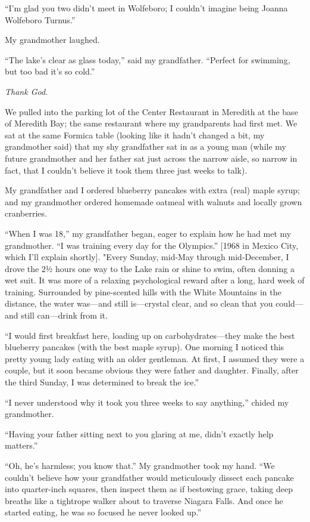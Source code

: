 ``I'm glad you two didn't meet in Wolfeboro; I couldn't imagine being
Joanna Wolfeboro Turnus.''

My grandmother laughed.

``The lake's clear as glass today,'' said my grandfather. ``Perfect for
swimming, but too bad it's so cold.''

\emph{Thank God.}

We pulled into the parking lot of the Center Restaurant in Meredith at
the base of Meredith Bay; the same restaurant where my grandparents had
first met. We sat at the same Formica table (looking like it hadn't
changed a bit, my grandmother said) that my shy grandfather sat in as a
young man (while my future grandmother and her father sat just across
the narrow aisle, so narrow in fact, that I couldn't believe it took
them three just weeks to talk).

My grandfather and I ordered blueberry pancakes with extra (real) maple
syrup; and my grandmother ordered homemade oatmeal with walnuts and
locally grown cranberries.

``When I was 18,'' my grandfather began, eager to explain how he had met
my grandmother. ``I was training every day for the Olympics.'' {[}1968
in Mexico City, which I'll explain shortly{]}. "Every Sunday, mid-May
through mid-December, I drove the 2½ hours one way to the Lake rain or
shine to swim, often donning a wet suit. It was more of a relaxing
psychological reward after a long, hard week of training. Surrounded by
pine-scented hills with the White Mountains in the distance, the water
was---and still is---crystal clear, and so clean that you could---and
still can---drink from it.

``I would first breakfast here, loading up on carbohydrates---they make
the best blueberry pancakes (with the best maple syrup). One morning I
noticed this pretty young lady eating with an older gentleman. At first,
I assumed they were a couple, but it soon became obvious they were
father and daughter. Finally, after the third Sunday, I was determined
to break the ice.''

``I never understood why it took you three weeks to say anything,''
chided my grandmother.

``Having your father sitting next to you glaring at me, didn't exactly
help matters.''

``Oh, he's harmless; you know that.'' My grandmother took my hand. ``We
couldn't believe how your grandfather would meticulously dissect each
pancake into quarter-inch squares, then inspect them as if bestowing
grace, taking deep breaths like a tightrope walker about to traverse
Niagara Falls. And once he started eating, he was so focused he never
looked up.''

